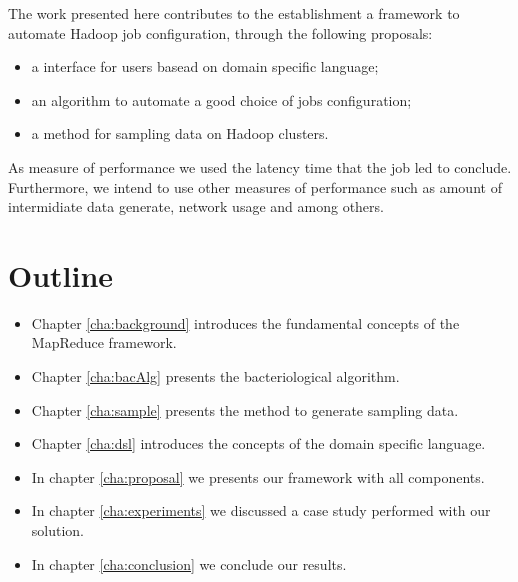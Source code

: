 The work presented here contributes to the establishment a framework to automate
Hadoop job configuration, through the following proposals:
\begin{itemize}
	\item a interface for users basead on domain specific language;
	\item an algorithm to automate a good choice of jobs configuration;
	\item a method for sampling data on Hadoop clusters.
\end{itemize}

As measure of performance we used the latency time that the job led to
conclude. Furthermore, we intend to use other measures of performance such as
amount of intermidiate data generate, network usage and among others.

\section{Outline}

\begin{itemize}
	\item Chapter \ref{cha:background} introduces the fundamental concepts of the MapReduce framework.
    \item Chapter \ref{cha:bacAlg} presents the bacteriological algorithm.
    \item Chapter \ref{cha:sample} presents the method to generate sampling
    data.
    \item Chapter \ref{cha:dsl} introduces the concepts of the domain specific language.
	\item In chapter \ref{cha:proposal} we presents our framework with all components.
    \item In chapter \ref{cha:experiments} we discussed a case study performed with our solution.
	\item In chapter \ref{cha:conclusion} we conclude our results.
\end{itemize}




